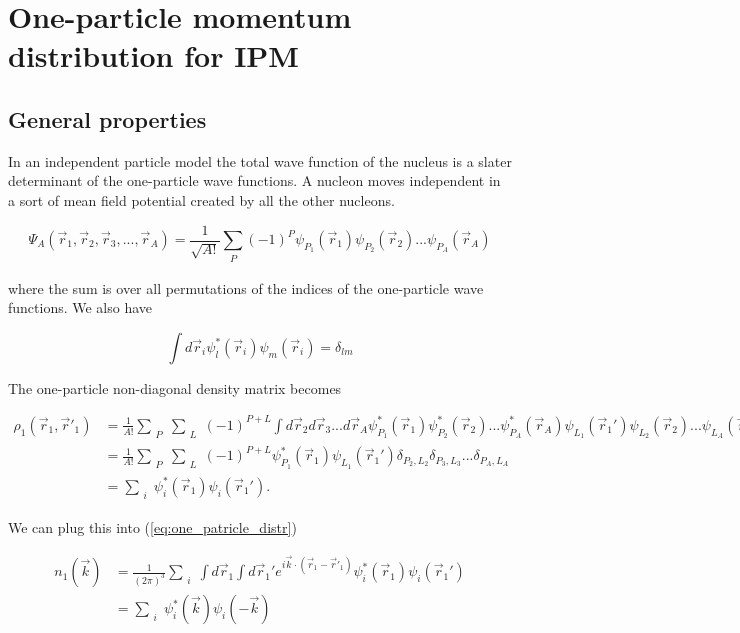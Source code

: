 \documentclass[12pt]{article}
\begin{document}
 





\section{One-particle momentum distribution for IPM}
\subsection{General properties}

In an independent particle model the total wave function of the nucleus is a slater determinant of the one-particle wave functions. A nucleon moves independent in a sort of mean field potential created by all the other nucleons. 

\begin{equation}
\Psi_A(\vec{r}_1,\vec{r}_2,\vec{r}_3, ... ,\vec{r}_A)= \frac{1}{\sqrt{A!}} \sum_{\substack{P}} 
													  (-1)^P \psi_{P_1}(\vec{r}_1)
													         \psi_{P_2}(\vec{r}_2)...
													         \psi_{P_A}(\vec{r}_A)
\end{equation}

where the sum is over all permutations of the indices of the one-particle wave functions. We also have 

\begin{equation}
\int d\vec{r}_i \psi^*_l(\vec{r}_i)\psi_m(\vec{r}_i) = \delta_{lm}
\end{equation}

The one-particle non-diagonal density matrix becomes

\begin{align}
\rho_1(\vec{r}_1,\vec{r}'_1) & = \frac{1}{A!} 	 \sum_{\substack{P}} \sum_{\substack{L}} (-1)^{P+L} \int d\vec{r}_2 d\vec{r}_3 ... d\vec{r}_A 
\psi^*_{P_1}(\vec{r}_1)\psi^*_{P_2}(\vec{r}_2)...\psi^*_{P_A}(\vec{r}_A)
\psi_{L_1}(\vec{r}_1')\psi_{L_2}(\vec{r}_2)...\psi_{L_A}(\vec{r}_A) \\
&  = \frac{1}{A!} 	 \sum_{\substack{P}} \sum_{\substack{L}} (-1)^{P+L} \psi^*_{P_1}(\vec{r}_1) \psi_{L_1}(\vec{r}_1') 
\delta_{P_2,L_2}\delta_{P_3,L_3}...\delta_{P_A,L_A} \\
& = \sum_{\substack{i}} \psi^*_i(\vec{r}_1) \psi_i(\vec{r}_1').
\end{align}

We can plug this into (\ref{eq:one_patricle_distr})

\begin{align} 
	n_1(\vec{k})&=\frac{1}{(2\pi)^3} \sum_{\substack{i}} \int d\vec{r}_1 \int d\vec{r}_1' e^{i\vec{k}\cdot (\vec{r}_1-\vec{r}'_1)}
	\psi^*_i(\vec{r}_1)\psi_i(\vec{r}_1') \\
	& = \sum_{\substack{i}} \psi^*_i(\vec{k})\psi_i(-\vec{k})
\end{align}
	
\end{document}
